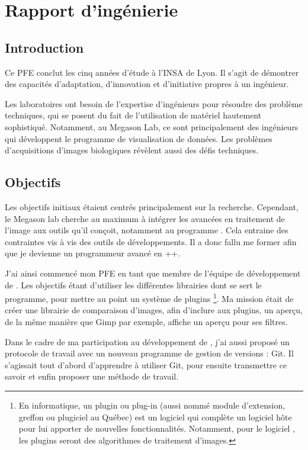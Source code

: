 

\chapter{Rapport d'ingénierie} 


\section*{Introduction}
Ce PFE conclut les cinq années d'étude à l'INSA de Lyon. 
Il s'agit de démontrer des capacités d'adaptation,
d'innovation et d'initiative propres à un ingénieur.

Les laboratoires ont besoin de l'expertise d'ingénieurs
pour résoudre des problème techniques, qui se posent du fait de l'utilisation de matériel hautement sophistiqué.
Notamment, au Megason Lab, ce sont principalement des ingénieurs qui développent le programme de visualisation de données. 
Les problèmes d'acquisitions d'images biologiques révèlent aussi des défis techniques.
 
\section*{Objectifs}

Les objectifs initiaux étaient centrés principalement sur la recherche.
Cependant, le Megason lab cherche au maximum à intégrer les avancées en traitement de l'image aux outils qu'il conçoit,
 notamment au programme \gofigure. Cela entraine des contraintes vis à vis des outils de développements. 
 Il a donc fallu me former afin que je devienne un programmeur avancé en {\C++}. 
 
J'ai ainsi commencé mon PFE en tant que membre de l'équipe de développement de {\gofigure}.
 Les objectifs étant d'utiliser les différentes librairies dont se sert le programme, pour mettre au point un système de plugins
 \footnote{En informatique, un plugin ou plug-in (aussi nommé module d'extension, greffon ou plugiciel au Québec) est un logiciel qui complète un logiciel hôte pour lui apporter de nouvelles fonctionnalités. Notamment, pour le logiciel \gofigure, les plugins seront des algorithmes de traitement d'images.}. 
 Ma mission était de créer une librairie de comparaison d'images, afin d'inclure aux plugins, un aperçu, de la même manière que Gimp par exemple, affiche un aperçu pour ses filtres.

Dans le cadre de ma participation au développement de \gofigure,
 j'ai aussi proposé un protocole de travail avec un nouveau programme de gestion de versions : Git.
 Il s'agissait tout d'abord d'apprendre à utiliser Git, pour ensuite transmettre ce savoir et enfin proposer une méthode de travail.

